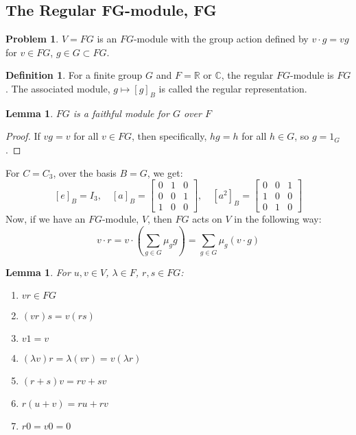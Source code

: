 \documentclass[11pt, notitlepage]{article}
\numberwithin{equation}{section}
\theoremstyle{plain}
\newtheorem{lemma}[theorem]{Lemma}
\theoremstyle{definition}
\newtheorem{definition}[theorem]{Definition}
\newtheorem{problem}{Problem}
\newenvironment{example}
	{\pushQED{\qed}\renewcommand{\qedsymbol}{$\blacktriangleleft$}\examplex}
	{\popQED\endexamplex}
\newcommand{\R}{\mathbb{R}}
\newcommand{\C}{\mathbb{C}}
\begin{document}
\subsection{The Regular FG-module, FG}
\begin{problem}
	$V=FG$ is an $FG$-module with the group action defined by $v\cdot g=vg$ for $v\in FG$, $g\in G\subset FG$.
\end{problem}
\begin{definition}
	For a finite group $G$ and $F=\R$ or $\C$, the regular $FG$-module is $FG$. The associated module, $g\mapsto [g]_B$ is called the regular representation.
\end{definition}
\begin{lemma}
	$FG$ is a faithful module for $G$ over $F$
\end{lemma}
\begin{proof}
	If $vg=v$ for all $v\in FG$, then specifically, $hg=h$ for all $h\in G$, so $g=1_G$.
\end{proof}
\begin{example}
	For $C=C_3$, over the basis $B=G$, we get:
	\[[e]_B=I_3,\quad [a]_B = \begin{bmatrix}
	0&1&0\\0&0&1\\1&0&0
	\end{bmatrix},\quad[a^2]_B=\begin{bmatrix}
	0&0&1\\1&0&0\\0&1&0
	\end{bmatrix}\]
\end{example}
Now, if we have an $FG$-module, $V$, then $FG$ acts on $V$ in the following way:
\[v\cdot r = v\cdot \left(\sum_{g\in G}\mu_g g\right) = \sum_{g\in G}\mu_g(v\cdot g)\]
\begin{lemma}
	For $u,v\in V$, $\lambda\in F$, $r,s\in FG$:
	\begin{enumerate}
		\item $vr\in FG$\\
		\item $(vr)s = v(rs)$\\
		\item $v1=v$\\
		\item $(\lambda v)r=\lambda(vr)=v(\lambda r)$\\
		\item $(r+s)v=rv+sv$\\
		\item $r(u+v)=ru+rv$\\
		\item $r0=v0=0$
	\end{enumerate}
\end{lemma}
\end{document}

